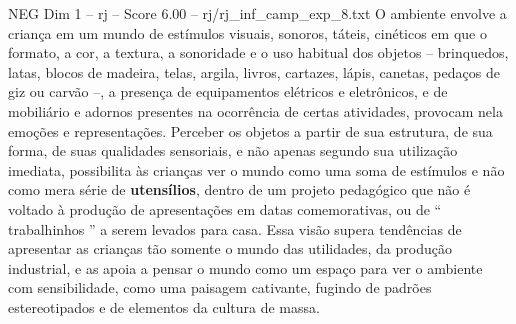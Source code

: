 \begin{textsample}{NEG Dim 1 – rj – Score 6.00 – rj/rj\_inf\_camp\_exp\_8.txt}
O ambiente envolve a criança em um mundo de estímulos visuais, sonoros, táteis, cinéticos em que o formato, a cor, a textura, a sonoridade e o uso habitual dos objetos – brinquedos, latas, blocos de madeira, telas, argila, livros, cartazes, lápis, canetas, pedaços de giz ou carvão –, a presença de equipamentos elétricos e eletrônicos, e de mobiliário e adornos presentes na ocorrência de certas atividades, provocam nela emoções e representações.
Perceber os objetos a partir de sua estrutura, de sua forma, de suas qualidades sensoriais, e não apenas segundo sua utilização imediata, possibilita às crianças ver o mundo como uma soma de estímulos e não como mera série de \textbf{utensílios}, dentro de um projeto pedagógico que não é voltado à produção de apresentações em datas comemorativas, ou de “ trabalhinhos ” a serem levados para casa.
Essa visão supera tendências de apresentar as crianças tão somente o mundo das utilidades, da produção industrial, e as apoia a pensar o mundo como um espaço para ver o ambiente com sensibilidade, como uma paisagem cativante, fugindo de padrões estereotipados e de elementos da cultura de massa.

\end{textsample}
